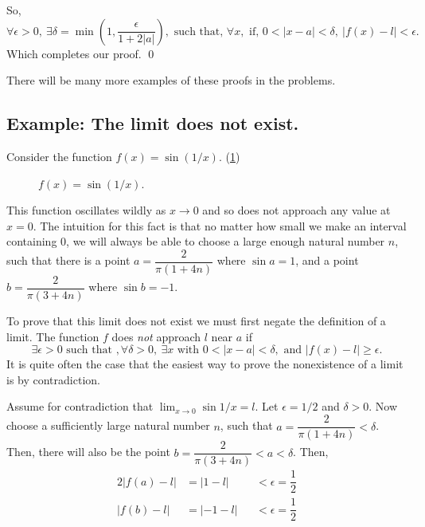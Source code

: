 \documentclass[10pt]{book}
\begin{document}
So,
\[
  \forall \epsilon > 0,\ \exists \delta=\min\left(1, \dfrac{\epsilon}{1+2|a|}\right), \text{ such that, } \forall x,
  \text{ if, } 0 < |x-a| < \delta,\ |f(x)-l| < \epsilon.
\]
Which completes our proof. \qed

There will be many more examples of these proofs in the problems.

\subsection{Example: The limit does not exist.}

Consider the function $f(x)=\sin(1/x)$. (\cref{fig:sin1x})
\begin{figure}[H]
  \centering
  \caption{$f(x)=\sin(1/x)$.}
  \label{fig:sin1x}
\end{figure}

This function oscillates wildly as $x \to 0$ and so does not approach any value at $x=0$. The intuition for this fact is that no matter how small we make an
interval containing $0$, we will always be able to choose a large enough natural number $n$, such that there is a point $a=\dfrac{2}{\pi(1+4n)}$ where $\sin{a}=1$, and
a point $b=\dfrac{2}{\pi(3+4n)}$ where $\sin{b}=-1$.

To prove that this limit does not exist we must first negate the definition of a limit. The function $f$ does \emph{not} approach $l$ near $a$ if
\[
  \exists \epsilon > 0 \text{ such that }, \forall \delta > 0,\ \exists x \text{ with } 0< |x-a| < \delta,\text{ and } |f(x)-l| \ge \epsilon.
\]
It is quite often the case that the easiest way to prove the nonexistence of a limit is by contradiction.

Assume for contradiction that $\lim_{x \to 0}\sin{1/x}=l$. Let $\epsilon=1/2$ and $\delta > 0$. Now choose a sufficiently large natural number $n$, such that
$a=\dfrac{2}{\pi(1+4n)}< \delta$. Then, there will also be the point $b=\dfrac{2}{\pi(3+4n)} < a < \delta$. Then,
\begin{alignat*}{2}
  |f(a)-l| & = |1-l|   &  & < \epsilon = \dfrac{1}{2} \\
  |f(b)-l| & = | -1-l| &  & < \epsilon = \dfrac{1}{2}
\end{alignat*}
\end{document}
